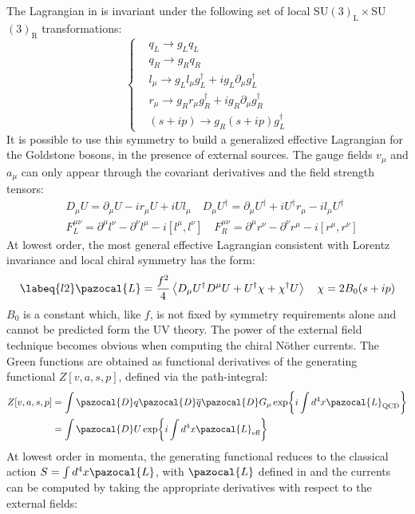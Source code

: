 \documentclass[../main.tex]{subfiles}
\begin{document}
The Lagrangian in  is invariant under the following set of local SU$(3)_{\text{L}}\times$SU$(3)_{\text{R}}$ transformations:
\[
\left\{
\begin{aligned}
&q_L\to g_Lq_L\\
&q_R\to g_Rq_R\\
&l_\mu\to g_Ll_\mu g_L^\dagger+ig_L\partial_\mu g_L^\dagger\\
&r_\mu\to g_Rr_\mu g_R^\dagger+ig_R\partial_\mu g_R^\dagger\\
&(s+ip)\to g_R(s+ip)g_L^\dagger
\end{aligned}
\right.
\]
It is possible to use this symmetry to build a generalized effective Lagrangian for the
Goldstone bosons, in the presence of external sources. The gauge fields $v_\mu$ and $a_\mu$ can only appear through the covariant derivatives and the field strength tensors:
\[
\begin{aligned}
&D_\mu U=\partial_\mu U-ir_\mu U+iUl_\mu \quad D_\mu U^\dagger=\partial_\mu U^\dagger+iU^\dagger r_\mu-il_\mu U^\dagger\\
&F^{\mu\nu}_L=\partial^\mu l^\nu-\partial^\nu l^\mu-i[l^\mu,l^\nu] \quad F^{\mu\nu}_R=\partial^\mu r^\nu-\partial^\nu r^\mu-i[r^\mu,r^\nu]
\end{aligned}
\]
At lowest order, the most general effective Lagrangian consistent with Lorentz invariance and local chiral symmetry has the form: 
\begin{equation}
\labeq{l2}    
\pazocal{L}=\frac{f^2}{4}\Braket{D_\mu U^\dagger D^\mu U+U^\dagger\chi+\chi^\dagger U} \quad \chi=2B_0(s+ip)
\end{equation}
$B_0$ is a constant which, like $f$, is not fixed by symmetry requirements alone and cannot be predicted form the UV theory. The power of the external field technique becomes obvious when computing the chiral N\"other currents. The Green functions are obtained as
functional derivatives of the generating functional $Z[v,a,s,p]$, defined via
the path-integral:
\begin{align*}
Z[v,a,s,p]&=\int\pazocal{D}q\pazocal{D}\overline{q}\pazocal{D}G_\mu\exp{i\int d^4x\pazocal{L}_{\text{QCD}}}\\
&=\int\pazocal{D}U\exp{i\int d^4x\pazocal{L}_{\text{eff}}}
\end{align*}
At lowest order in momenta, the generating functional reduces to the classical action $S=\int d^4x\pazocal{L}$, with $\pazocal{L}$ defined in  and the currents can be computed by taking the appropriate derivatives with respect to the external fields:
\end{document}
